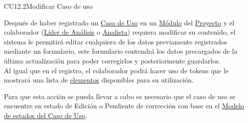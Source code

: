 	\begin{UseCase}{CU12.2}{Modificar Caso de uso}{
			
		Después de haber registrado un \hyperlink{casoUso}{Caso de Uso} en un \hyperlink{moduloEntidad}{Módulo} del \hyperlink{proyectoEntidad}{Proyecto} y el colaborador (\hyperlink{jefe}{Líder de Análisis} o \hyperlink{analista}{Analista}) requiera modificar su contenido, el sistema le permitirá editar cualquiera de los datos previamente registrados mediante un formulario, este formulario contendrá los datos precargados de la última actualización para poder corregirlos y posteriormente guardarlos.\\
	    Al igual que en el registro, el colaborador podrá hacer uso de tokens que le mostrará una lista de \hyperlink{tElemento}{elementos} disponibles para su utilización.
		
		Para que esta acción se pueda llevar a cabo es necesario que el caso de uso se encuentre en estado de Edición o Pendiente de corrección con base en el \hyperlink{edoCU}{Modelo de estados del Caso de Uso}.

}


\end{UseCase}
